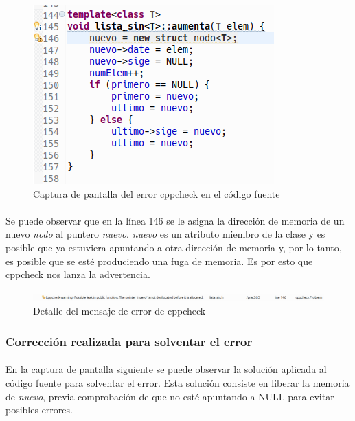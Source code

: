 			\begin{figure}[H]
				\centering
				\includegraphics[scale=0.55]{img/captura91.png}
				\caption{Captura de pantalla del error cppcheck en el código fuente}
				\label{captura91}
			\end{figure}
		
			\paragraph{}Se puede observar que en la línea 146 se le asigna la dirección de memoria de un nuevo \textit{nodo} al puntero \textit{nuevo}. \textit{nuevo} es un atributo miembro de la clase y es posible que ya estuviera apuntando a otra dirección de memoria y, por lo tanto, es posible que se esté produciendo una fuga de memoria. Es por esto que cppcheck nos lanza la advertencia.
		
			\begin{figure}[H]
				\centering
				\includegraphics[scale=0.38]{img/captura92.png}
				\caption{Detalle del mensaje de error de cppcheck}
				\label{captura92}
			\end{figure}
	
		\subsubsection{Corrección realizada para solventar el error}
		
			\paragraph{}En la captura de pantalla siguiente se puede observar la solución aplicada al código fuente para solventar el error. Esta solución consiste en liberar la memoria de \textit{nuevo}, previa comprobación de que no esté apuntando a NULL para evitar posibles errores.
		
